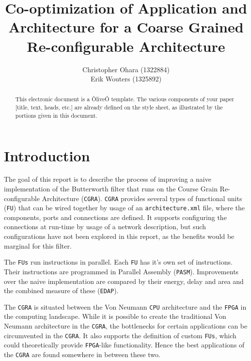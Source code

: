 \documentclass[letterpaper, 10 pt, conference]{ieeeconf}  %
\title{\LARGE \bf
Co-optimization of Application and Architecture
for a Coarse Grained Re-configurable Architecture
}
\author{Christopher Ohara (1322884) \\
Erik Wouters (1325892)
}
\begin{document}
\maketitle
\thispagestyle{empty}
\pagestyle{empty}

\begin{abstract}

This electronic document is a ÒliveÓ template. The various components of your paper [title, text, heads, etc.] are already defined on the style sheet, as illustrated by the portions given in this document.

\end{abstract}

\section{Introduction}

The goal of this report is to describe the process of improving a naive implementation of the Butterworth filter\cite{Podder} that runs on the Course Grain Re-configurable Architecture (\texttt{CGRA}). \texttt{CGRA} provides several types of functional units (\texttt{FU}) that can be wired together by usage of an \texttt{architecture.xml} file, where the components, ports and connections are defined. It supports configuring the connections at run-time by usage of a network description, but such configurations have not been explored in this report, as the benefits would be marginal for this filter.

The \texttt{FUs} run instructions in parallel. Each \texttt{FU} has it's own set of instructions. Their instructions are programmed in Parallel Assembly (\texttt{PASM}). Improvements over the naive implementation are compared by their energy, delay and area and the combined measure of these (\texttt{EDAP}).

The \texttt{CGRA} is situated between the Von Neumann \texttt{CPU} architecture\cite{Neumann} and the \texttt{FPGA} in the computing landscape. While it is possible to create the traditional Von Neumann architecture in the \texttt{CGRA}, the bottlenecks for certain applications can be circumvented in the \texttt{CGRA}. It also supports the definition of custom \texttt{FUs}, which could theoretically provide \texttt{FPGA}-like functionality. Hence the best applications of the \texttt{CGRA} are found somewhere in between these two.
\end{document}
